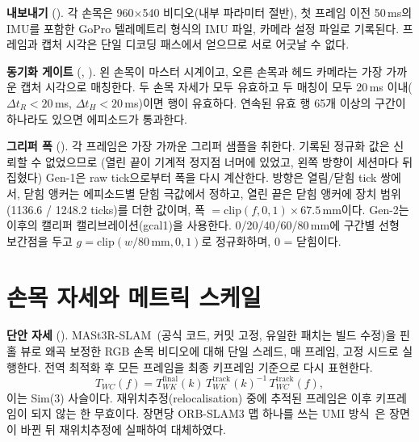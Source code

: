 \documentclass[conference,10pt]{IEEEtran}
\newcommand{\mm}{\,mm\xspace}
\begin{document}
\textbf{내보내기} (). 각 손목은 960$\times$540 비디오(내부 파라미터 절반), 첫 프레임
이전 50\,ms의 IMU를 포함한 GoPro 텔레메트리 형식의 IMU 파일, 카메라 설정 파일로 기록된다. 프레임과 캡처 시각은 단일 디코딩 패스에서
얻으므로 서로 어긋날 수 없다.

\textbf{동기화 게이트} (, ). 왼 손목이 마스터 시계이고, 오른 손목과 헤드
카메라는 가장 가까운 캡처 시각으로 매칭한다. 두 손목 자세가 모두 유효하고 두 매칭이 모두 20\,ms 이내($\Delta t_R<20$\,ms,
$\Delta t_H<20$\,ms)이면 행이 유효하다. 연속된 유효 행 65개 이상의 구간이 하나라도 있으면 에피소드가 통과한다.

\textbf{그리퍼 폭} (). 각 프레임은 가장 가까운 그리퍼 샘플을 취한다. 기록된 정규화 값은 신뢰할 수 없었으므로
(열린 끝이 기계적 정지점 너머에 있었고, 왼쪽 방향이 세션마다 뒤집혔다) Gen-1은 raw tick으로부터 폭을 다시 계산한다. 방향은 열림/닫힘
tick 쌍에서, 닫힘 앵커는 에피소드별 닫힘 극값에서 정하고, 열린 끝은 닫힘 앵커에 장치 범위(1136.6 / 1248.2 ticks)를 더한 값이며,
폭 $= \mathrm{clip}(f,0,1)\times 67.5$\mm{}이다. Gen-2는 이후의 캘리퍼 캘리브레이션(gcal1)을 사용한다. 0/20/40/60/80\mm{}에 구간별
선형 보간점을 두고 $g=\mathrm{clip}(w/80\,\text{mm},0,1)$로 정규화하며, 0 = 닫힘이다.

\section{손목 자세와 메트릭 스케일}\label{sec:pose}
\textbf{단안 자세} (). MASt3R-SLAM~\cite{murai2025mast3rslam}(공식 코드, 커밋 고정,
유일한 패치는 빌드 수정)을 핀홀 뷰로 왜곡 보정한 RGB 손목 비디오에 대해 단일 스레드, 매 프레임, 고정 시드로 실행한다. 전역 최적화
후 모든 프레임을 최종 키프레임 기준으로 다시 표현한다.
\begin{equation}
T_{WC}(f) = T_{WK}^{\text{final}}(k)\,T_{WK}^{\text{track}}(k)^{-1}\,T_{WC}^{\text{track}}(f),
\end{equation}
이는 Sim(3) 사슬이다. 재위치추정(relocalisation) 중에 추적된 프레임은 이후 키프레임이 되지 않는 한 무효이다. 장면당 ORB-SLAM3 맵
하나를 쓰는 UMI 방식~\cite{chi2024umi}은 장면이 바뀐 뒤 재위치추정에 실패하여 대체하였다.
\end{document}
